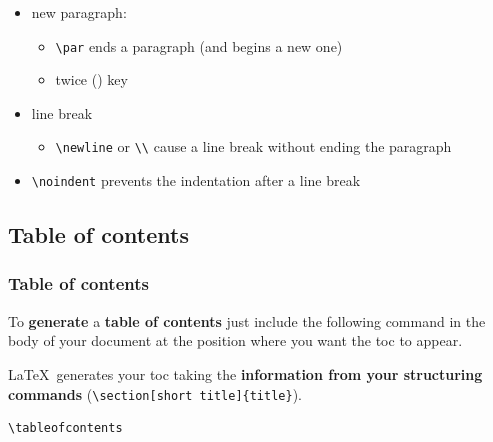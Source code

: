 \begin{frame}[fragile]


\begin{itemize}
	\item new paragraph: 
		\begin{itemize}
			\item \lstinline|\par| ends a paragraph (and begins a new one)
			\item twice  () key
		\end{itemize}
	
	\item line break
		\begin{itemize}
			\item \lstinline|\newline| or \lstinline|\\| cause a line break without ending the paragraph
		\end{itemize}
	
	\item \lstinline|\noindent| prevents the indentation after a line break
	
\end{itemize}

\end{frame}


\subsection{Table of contents}

\begin{frame}[fragile]
\frametitle{Table of contents}

To \textbf{generate} a \textbf{table of contents} just include the following command in the body of your document at the position where you want the toc to appear.

\LaTeX\ generates your toc taking the \textbf{information from your structuring commands} (\fe \lstinline|\section[short title]{title}|).

\begin{lstlisting}
\tableofcontents
\end{lstlisting}

\end{frame}


